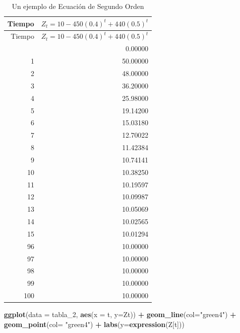 \documentclass[
]{book}
\newenvironment{Shaded}{\begin{snugshade}}{\end{snugshade}}
\newcommand{\AttributeTok}[1]{\textcolor[rgb]{0.13,0.29,0.53}{#1}}
\newcommand{\FunctionTok}[1]{\textcolor[rgb]{0.13,0.29,0.53}{\textbf{#1}}}
\newcommand{\NormalTok}[1]{#1}
\newcommand{\SpecialCharTok}[1]{\textcolor[rgb]{0.81,0.36,0.00}{\textbf{#1}}}
\newcommand{\StringTok}[1]{\textcolor[rgb]{0.31,0.60,0.02}{#1}}
\begin{document}
\begin{longtable}[]{@{}rr@{}}
\caption{\label{tab:table2}Un ejemplo de Ecuación de Segundo Orden}\tabularnewline
\toprule\noalign{}
Tiempo & \(Z_t =10-450(0.4)^t+440(0.5)^t\) \\
\midrule\noalign{}
\endfirsthead
\toprule\noalign{}
Tiempo & \(Z_t =10-450(0.4)^t+440(0.5)^t\) \\
\midrule\noalign{}
\endhead
\bottomrule\noalign{}
\endlastfoot
0 & 0.00000 \\
1 & 50.00000 \\
2 & 48.00000 \\
3 & 36.20000 \\
4 & 25.98000 \\
5 & 19.14200 \\
6 & 15.03180 \\
7 & 12.70022 \\
8 & 11.42384 \\
9 & 10.74141 \\
10 & 10.38250 \\
11 & 10.19597 \\
12 & 10.09987 \\
13 & 10.05069 \\
14 & 10.02565 \\
15 & 10.01294 \\
96 & 10.00000 \\
97 & 10.00000 \\
98 & 10.00000 \\
99 & 10.00000 \\
100 & 10.00000 \\
\end{longtable}

\begin{Shaded}
\begin{Highlighting}[]
\FunctionTok{ggplot}\NormalTok{(}\AttributeTok{data =}\NormalTok{ tabla\_2, }\FunctionTok{aes}\NormalTok{(}\AttributeTok{x =}\NormalTok{ t, }\AttributeTok{y=}\NormalTok{Zt)) }\SpecialCharTok{+}
  \FunctionTok{geom\_line}\NormalTok{(}\AttributeTok{col=}\StringTok{"green4"}\NormalTok{) }\SpecialCharTok{+}
  \FunctionTok{geom\_point}\NormalTok{(}\AttributeTok{col=} \StringTok{"green4"}\NormalTok{) }\SpecialCharTok{+}
  \FunctionTok{labs}\NormalTok{(}\AttributeTok{y=}\FunctionTok{expression}\NormalTok{(Z[t]))}
\end{Highlighting}
\end{Shaded}
\end{document}
